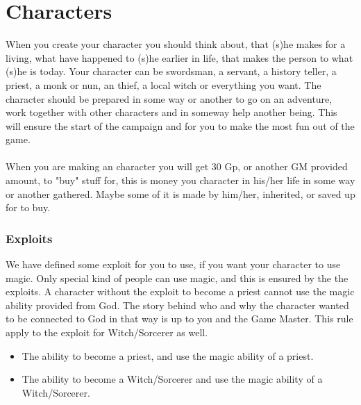 \chapter{Characters}
When you create your character you should think about, that (s)he makes for a living, what have happened to (s)he earlier in life, that makes the person to what (s)he is today.
Your character can be swordsman, a servant, a history teller, a priest, a monk or nun, an thief, a local witch or everything you want.
The character should be prepared in some way or another to go on an adventure, work together with other characters and in someway help another being.
This will ensure the start of the campaign and for you to make the most fun out of the game.
\\\\
When you are making an character you will get 30 Gp, or another GM provided amount, to "buy" stuff for, this is money you character in his/her life in some way or another gathered.
Maybe some of it is made by him/her, inherited, or saved up for to buy.

\subsection{Exploits}
We have defined some exploit for you to use, if you want your character to use magic.
Only special kind of people can use magic, and this is ensured by the the exploits.
A character without the exploit to become a priest cannot use the magic ability provided from God.
The story behind who and why the character wanted to be connected to God in that way is up to you and the Game Master.
This rule apply to the exploit for Witch/Sorcerer as well.

\begin{itemize}
    \item The ability to become a priest, and use the magic ability of a priest.
    \item The ability to become a Witch/Sorcerer and use the magic ability of a Witch/Sorcerer.
\end{itemize}
